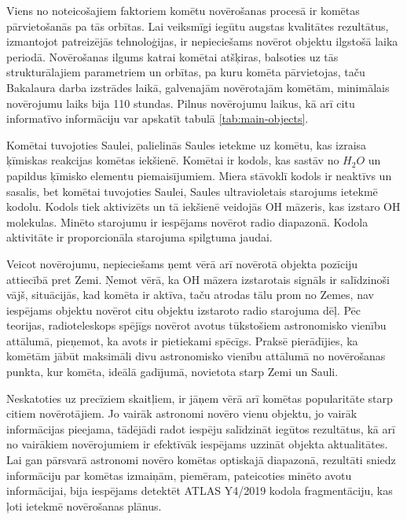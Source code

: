 Viens no noteicošajiem faktoriem komētu novērošanas procesā ir komētas pārvietošanās pa tās orbītas. Lai veiksmīgi iegūtu augstas kvalitātes rezultātus, izmantojot patreizējās tehnoloģijas, ir nepieciešams novērot objektu ilgstošā laika periodā. Novērošanas ilgums katrai komētai atšķiras, balsoties uz tās strukturālajiem parametriem un orbītas, pa kuru komēta pārvietojas, taču Bakalaura darba izstrādes laikā, galvenajām novērotajām komētām, minimālais novērojumu laiks bija 110 stundas. Pilnus novērojumu laikus, kā arī citu informatīvo informāciju var apskatīt tabulā  \ref{tab:main-objects}.

Komētai tuvojoties Saulei, palielinās Saules ietekme uz komētu, kas izraisa ķīmiskas reakcijas komētas iekšienē. Komētai ir kodols, kas sastāv no $H_2O$ un papildus ķīmisko elementu piemaisījumiem. Miera stāvoklī kodols ir neaktīvs un sasalis, bet komētai tuvojoties Saulei, Saules ultravioletais starojums ietekmē kodolu. Kodols tiek aktivizēts un tā iekšienē veidojās OH māzeris, kas izstaro OH molekulas. Minēto starojumu ir iespējams novērot radio diapazonā. Kodola aktivitāte ir proporcionāla starojuma spilgtuma jaudai.


Veicot novērojumu, nepieciešams ņemt vērā arī novērotā objekta pozīciju attiecībā pret Zemi. Ņemot vērā, ka OH māzera izstarotais signāls ir salīdzinoši vājš, situācijās, kad komēta ir aktīva, taču atrodas tālu prom no Zemes, nav iespējams objektu novērot citu objektu izstaroto radio starojuma dēļ. Pēc teorijas, radioteleskops spējīgs novērot avotus tūkstošiem astronomisko vienību attālumā, pieņemot, ka avots ir pietiekami spēcīgs. Praksē pierādījies, ka komētām jābūt maksimāli divu astronomisko vienību attālumā no novērošanas punkta, kur komēta, ideālā gadījumā, novietota starp Zemi un Sauli.

Neskatoties uz precīziem skaitļiem, ir jāņem vērā arī komētas popularitāte starp citiem novērotājiem. Jo vairāk astronomi novēro vienu objektu, jo vairāk informācijas pieejama, tādējādi radot iespēju salīdzināt iegūtos rezultātus, kā arī no vairākiem novērojumiem ir efektīvāk iespējams uzzināt objekta aktualitātes. Lai gan pārsvarā astronomi novēro komētas optiskajā diapazonā, rezultāti sniedz informāciju par komētas izmaiņām, piemēram, pateicoties minēto avotu informācijai, bija iespējams detektēt ATLAS Y4/2019 kodola fragmentāciju, kas ļoti ietekmē novērošanas plānus.



